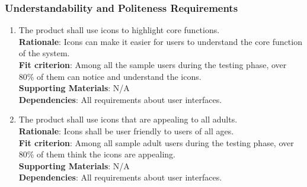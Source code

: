 \documentclass{article}
\begin{document}
\subsubsection{Understandability and Politeness Requirements}
\begin{enumerate}[UH4.1]
    \item The product shall use icons to highlight core functions.\\
    \textbf{Rationale}: Icons can make it easier for users to understand the core function of the system.\\
    \textbf{Fit criterion}: Among all the sample users during the 
    testing phase, over 80\% of them can notice and understand the icons.\\
\textbf{Supporting Materials}: N/A\\
\textbf{Dependencies}: All requirements about user interfaces.\\
    
    \item The product shall use icons that are appealing to all adults.\\
    \textbf{Rationale}: Icons shall be user friendly to users of all ages.\\
    \textbf{Fit criterion}: Among all sample adult users during the 
    testing phase, over 80\% of them think the icons are appealing.\\
\textbf{Supporting Materials}: N/A\\
\textbf{Dependencies}: All requirements about user interfaces.\\

\end{enumerate}
\end{document}
